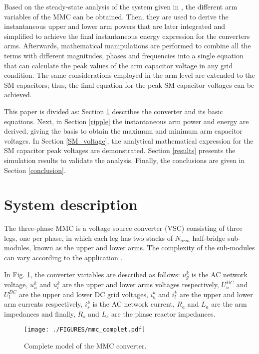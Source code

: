 \documentclass[journal]{IEEEtran}
\begin{document}
Based on the steady-state analysis of the system given in \cite{IECON}, the different arm variables of the MMC can be obtained. Then, they are used to derive the instantaneous upper and lower arm powers that are later integrated and simplified to achieve the final instantaneous energy expression for the converters arms. Afterwards, mathematical manipulations are performed to combine all the terms with different magnitudes, phases and frequencies into a single equation that can calculate the peak values of the arm capacitor voltage in any grid condition. The same considerations employed in the arm level are extended to the SM capacitors; thus, the final equation for the peak SM capacitor voltages can be achieved.


This paper is divided as: Section \ref{System_Description} describes the converter and its basic equations. Next, in Section \ref{ripple} the instantaneous arm power and energy are derived, giving the basis to obtain the maximum and minimum arm capacitor voltages. In Section \ref{SM_voltage}, the analytical mathematical expression for the SM capacitor peak voltages are demonstrated. Section \ref{results} presents the simulation results to validate the analysis. Finally, the conclusions are given in Section \ref{conclusion}. 



\section{System description} \label{System_Description}

The three-phase MMC is a voltage source converter (VSC) consisting of three legs, one per phase, in which each leg has two stacks of $N_{arm}$ half-bridge sub-modules, known as the upper and lower arms. The complexity of the sub-modules can vary according to the application \cite{7656765}. 

In Fig. \ref{fig:MMC}, the converter variables are described as follows: $u_{g}^k$ is the AC network voltage, $u_{u}^k$ and $u_{l}^k$ are the upper and lower arms voltages respectively, $U_{u}^{DC}$ and $U_{l}^{DC}$ are the upper and lower DC grid voltages, $i_{u}^k$ and $i_{l}^k$ are the upper and lower arm currents respectively, $i_{s}^k$ is the AC network current, $R_a$ and $L_a$ are the arm impedances and finally, $R_s$ and $L_s$ are the phase reactor impedances.
~
\begin{figure}[!h]
\centerline{\texttt{[image: ./FIGURES/mmc\_complet.pdf]}}
\caption{Complete model of the MMC converter.}
\label{fig:MMC}
\end{figure}
\end{document}
